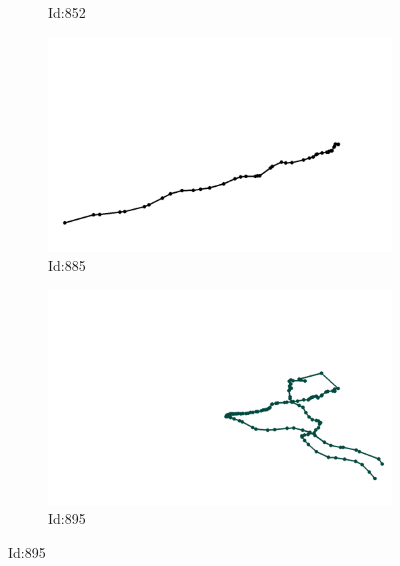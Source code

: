 \documentclass[12pt,twoside]{report}
\begin{document}
\begin{figure}
\begin{subfigure}[b]{0.20\textwidth}
\caption{Id:852}
\end{subfigure}
\begin{subfigure}[b]{0.20\textwidth}
\centering
\includegraphics[width=\textwidth]{../trajectories/885.png}
\caption{Id:885}
\end{subfigure}
\begin{subfigure}[b]{0.20\textwidth}
\centering
\includegraphics[width=\textwidth]{../trajectories/895.png}
\caption{Id:895}
\end{subfigure}
\end{figure}
\end{document}
